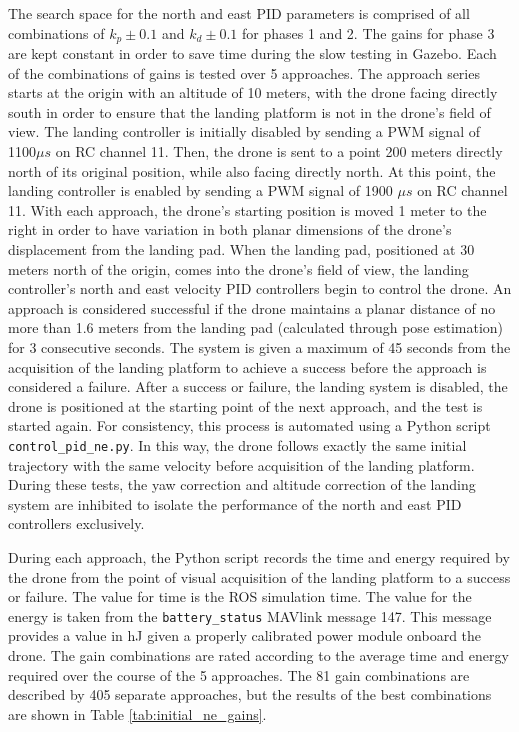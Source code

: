 The search space for the north and east PID parameters is comprised of all combinations of $k_p \pm 0.1$ and $k_d \pm 0.1$ for phases 1 and 2. The gains for phase 3 are kept constant in order to save time during the slow testing in Gazebo. Each of the combinations of gains is tested over 5 approaches. The approach series starts at the origin with an altitude of 10 meters, with the drone facing directly south in order to ensure that the landing platform is not in the drone's field of view. The landing controller is initially disabled by sending a PWM signal of 1100$\mu s$ on RC channel 11. Then, the drone is sent to a point 200 meters directly north of its original position, while also facing directly north. At this point, the landing controller is enabled by sending a PWM signal of 1900 $\mu s$ on RC channel 11. With each approach, the drone's starting position is moved 1 meter to the right in order to have variation in both planar dimensions of the drone's displacement from the landing pad. When the landing pad, positioned at 30 meters north of the origin, comes into the drone's field of view, the landing controller's north and east velocity PID controllers begin to control the drone. An approach is considered successful if the drone maintains a planar distance of no more than 1.6 meters from the landing pad (calculated through pose estimation) for 3 consecutive seconds. The system is given a maximum of 45 seconds from the acquisition of the landing platform to achieve a success before the approach is considered a failure. After a success or failure, the landing system is disabled, the drone is positioned at the starting point of the next approach, and the test is started again. For consistency, this process is automated using a Python script \texttt{control\_pid\_ne.py}. In this way, the drone follows exactly the same initial trajectory with the same velocity before acquisition of the landing platform. During these tests, the yaw correction and altitude correction of the landing system are inhibited to isolate the performance of the north and east PID controllers exclusively.

During each approach, the Python script records the time and energy required by the drone from the point of visual acquisition of the landing platform to a success or failure. The value for time is the ROS simulation time. The value for the energy is taken from the \texttt{battery\_status} MAVlink message 147. This message provides a value in \gls{hJ} given a properly calibrated power module onboard the drone. The gain combinations are rated according to the average time and energy required over the course of the 5 approaches. The 81 gain combinations are described by 405 separate approaches, but the results of the best combinations are shown in Table \ref{tab:initial_ne_gains}.

